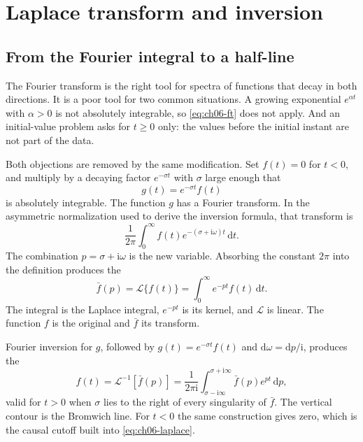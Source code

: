 \section{Laplace transform and inversion}

\subsection{From the Fourier integral to a half-line}

The Fourier transform is the right tool for spectra of functions that decay in both directions. It is a poor tool for two common situations. A growing exponential $e^{\alpha t}$ with $\alpha>0$ is not absolutely integrable, so \eqref{eq:ch06-ft} does not apply. And an initial-value problem asks for $t\geq 0$ only: the values before the initial instant are not part of the data.

Both objections are removed by the same modification. Set $f(t)=0$ for $t<0$, and multiply by a decaying factor $e^{-\sigma t}$ with $\sigma$ large enough that
\begin{equation}
g(t)=e^{-\sigma t}f(t)
\end{equation}
is absolutely integrable. The function $g$ has a Fourier transform. In the asymmetric normalization used to derive the inversion formula, that transform is
\begin{equation}
\frac{1}{2\pi}\int_0^{\infty}f(t)e^{-(\sigma+\mathrm{i}\omega)t}\,\mathrm{d}t.
\end{equation}
The combination $p=\sigma+\mathrm{i}\omega$ is the new variable. Absorbing the constant $2\pi$ into the definition produces the 
\begin{equation}
\bar f(p)=\mathcal{L}\{f(t)\}=\int_0^{\infty}e^{-pt}f(t)\,\mathrm{d}t.
\label{eq:ch06-laplace}
\end{equation}
The integral is the Laplace integral, $e^{-pt}$ is its kernel, and $\mathcal{L}$ is linear. The function $f$ is the original and $\bar f$ its transform.

Fourier inversion for $g$, followed by $g(t)=e^{-\sigma t}f(t)$ and $\mathrm{d}\omega=\mathrm{d}p/\mathrm{i}$, produces the 
\begin{equation}
f(t)=\mathcal{L}^{-1}[\bar f(p)]
=\frac{1}{2\pi\mathrm{i}}\int_{\sigma-\mathrm{i}\infty}^{\sigma+\mathrm{i}\infty}
\bar f(p)e^{pt}\,\mathrm{d}p,
\label{eq:ch06-bromwich}
\end{equation}
valid for $t>0$ when $\sigma$ lies to the right of every singularity of $\bar f$. The vertical contour is the Bromwich line. For $t<0$ the same construction gives zero, which is the causal cutoff built into \eqref{eq:ch06-laplace}.

